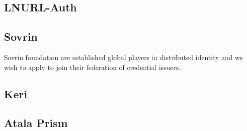 \subsection{LNURL-Auth}
\subsection{Sovrin}
Sovrin foundation are established global players in distributed identity and we wish to apply to join their federation of credential issuers.
\subsection{Keri}
\subsection{Atala Prism}
